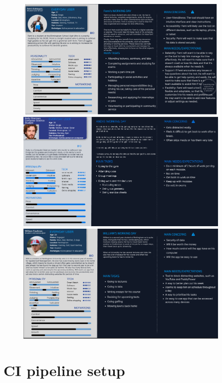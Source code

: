\documentclass[a4paper]{article}
\begin{document}
\begin{figure}[H] %
	\centering %
	\includegraphics[width=0.92\textwidth]{./images/Persona_Samuel.jpg}
	\includegraphics[width=0.92\textwidth]{./images/Persona_Smit.png}
	\includegraphics[width=0.92\textwidth]{./images/Persona_Matt.png}
	\caption*{} %
	\label{Fig.Persona3} %
\end{figure}

\section{CI pipeline setup}
\end{document}
